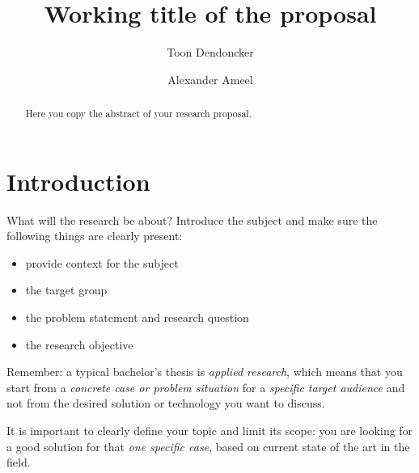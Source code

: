 \documentclass[english]{hogent-article}
\title{Working title of the proposal}
\author{Toon Dendoncker}
\author{Alexander Ameel}
\begin{document}
\begin{abstract}
  Here you copy the abstract of your research proposal.
\end{abstract}

\tableofcontents

\bigskip

%
%

%
%
%
%

\section{Introduction}%
\label{sec:Introduction}

What will the research be about? Introduce the subject and make sure the following things are clearly present:

\begin{itemize}
  \item provide context for the subject
  \item the target group
  \item the problem statement and research question
  \item the research objective
\end{itemize}

Remember: a typical bachelor's thesis is \emph{applied research}, which means that you start from a \emph{concrete case or problem situation} for a \emph{specific target audience} and not from the desired solution or technology you want to discuss.

It is important to clearly define your topic and limit its scope: you are looking for a good solution for that \textit{one specific case}, based on current state of the art in the field.
\end{document}
